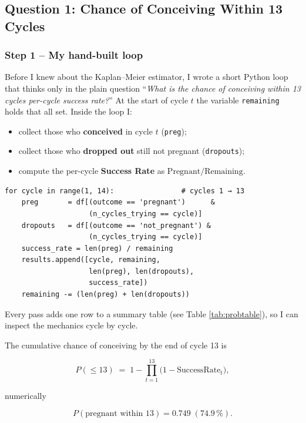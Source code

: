 \documentclass[11pt,a4paper]{article}
\begin{document}
\subsection{Question 1: Chance of Conceiving Within 13 Cycles}
\subsubsection{Step 1 – My hand-built loop}
Before I knew about the Kaplan–Meier estimator, I wrote a short Python loop that
thinks only in the plain question “\emph{What is the chance of conceiving within 13 cycles per-cycle success rate?}”
At the start of cycle $t$ the variable \texttt{remaining} holds that all set.
Inside the loop I:

\begin{itemize}
  \item collect those who \textbf{conceived} in cycle $t$ (\texttt{preg});
  \item collect those who \textbf{dropped out} still not pregnant (\texttt{dropouts});
  \item compute the per-cycle \textbf{Success Rate} as \(\text{Pregnant}/\text{Remaining}\).
\end{itemize}

\begin{center}
\begin{minipage}{0.9\linewidth}
\begin{verbatim}
for cycle in range(1, 14):                # cycles 1 → 13
    preg       = df[(outcome == 'pregnant')      &
                    (n_cycles_trying == cycle)]
    dropouts   = df[(outcome == 'not_pregnant') &
                    (n_cycles_trying == cycle)]
    success_rate = len(preg) / remaining
    results.append([cycle, remaining,
                    len(preg), len(dropouts),
                    success_rate])
    remaining -= (len(preg) + len(dropouts))     
\end{verbatim}
\end{minipage}
\end{center}

Every pass adds one row to a summary table (see Table \ref{tab:probtable}),
so I can inspect the mechanics cycle by cycle.

The cumulative chance of conceiving by the end of cycle 13 is

\[
P(\le 13)
   \;=\;
   1 - \prod_{t=1}^{13}\bigl(1 - \text{SuccessRate}_{t}\bigr),
\]

numerically

\[
\boxed{P(\text{pregnant within 13}) = 0.749 \; (74.9\,\%)}.
\]
\end{document}
